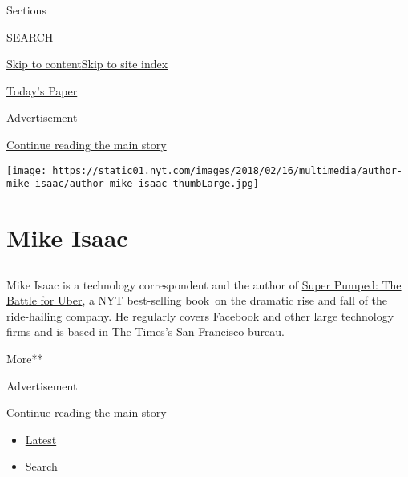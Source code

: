 Sections

SEARCH

\protect\hyperlink{site-content}{Skip to
content}\protect\hyperlink{site-index}{Skip to site index}

\href{https://myaccount.nytimes.com/auth/login?response_type=cookie\&client_id=vi}{}

\href{https://www.nytimes.com/section/todayspaper}{Today's Paper}

Advertisement

\protect\hyperlink{after-top}{Continue reading the main story}

\texttt{[image: https://static01.nyt.com/images/2018/02/16/multimedia/author-mike-isaac/author-mike-isaac-thumbLarge.jpg]}

\hypertarget{mike-isaac}{%
\section{Mike Isaac}\label{mike-isaac}}

\subsection{}

Mike Isaac is a technology correspondent and the author of
\href{https://www.amazon.com/gp/product/0393652246/ref=dbs_a_def_rwt_hsch_vapi_taft_p1_i0}{Super
Pumped: The Battle for Uber}, a NYT best-selling book~on the dramatic
rise and fall of the ride-hailing company. He regularly covers Facebook
and other large technology firms and is based in The Times's San
Francisco bureau.

More**

Advertisement

\protect\hyperlink{after-mid1}{Continue reading the main story}

\begin{itemize}
\tightlist
\item
  \protect\hyperlink{stream-panel}{Latest}
\item
  Search
\end{itemize}


